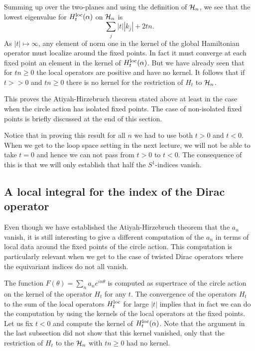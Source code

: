 Summing up over the two-planes and using the definition of ${\cal
H}_n$, we see that the lowest eigenvalue for
$H_t^{\rm loc}(\alpha)$ on ${\cal H}_n$ is
$$\sum_j|t||k_j|+2tn .$$  
As $|t|\mapsto \infty$, any element of norm one in the kernel of
the global Hamiltonian operator must localize around the fixed
points. In fact it must converge at each fixed point an element in the
kernel of  $H_t^{\rm loc}(\alpha)$.
But we have already seen that for $tn\ge 0$ the local operators are
positive and have no kernel.
It follows that  if $t>>0$ and $tn\ge 0$ there is no kernel for the
restriction of $H_t$  to ${\cal H}_n$. 


This proves the Atiyah-Hirzebruch theorem stated above at least in the
case when the  circle action has isolated fixed points.
The case of non-isolated fixed points is briefly discussed at the end
of this section.

Notice that in proving this result for all $n$ we had to use
both $t>0$ and $t<0$. 
 When we get to 
the loop space setting in the next lecture, we will not be able to
take $t=0$ and hence we can not pass from $t>0$ to $t<0$.  The
consequence of this is that we will only establish that half the
$S^1$-indices  vanish.

\subsection{A local integral for the index of the Dirac operator}

Even though we have established the Atiyah-Hirzebruch theorem that the
$a_n$ vanish, it is still interesting to give a different computation
of the $a_n$ in terms of local data around the fixed points of the
circle action.
This computation is particularly relevant when we get to the case of
twisted Dirac operators where the equivariant indices do not all vanish.

The function $F(\theta)=\sum_na_ne^{in\theta}$ is computed as
supertrace of the circle 
action  on the kernel of the operator $H_t$ for any $t$.
The convergence of the operators $H_t$ to the sum of the local operators
$H_t^{\rm loc}$ for large $|t|$ implies that in fact we can do the
computation by using the kernels of the local operators at the fixed points.
Let us fix $t<0$ and compute the kernel of $H_t^{\rm
loc}(\alpha)$. Note that the
argument in the last subsection did not show that this kernel
vanished, only that the restriction 
of $H_t$ to the ${\cal H}_n$ with $tn\ge 0$ had no kernel.


